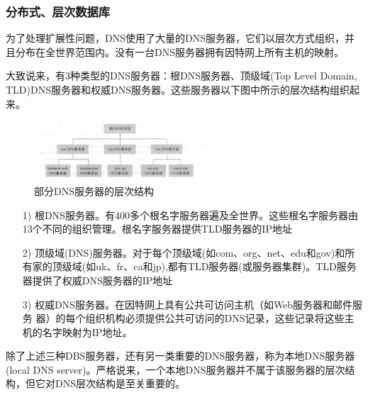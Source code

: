 \subsubsection{分布式、层次数据库}

    为了处理扩展性问题，DNS使用了大量的DNS服务器，它们以层次方式组织，并且分布在全世界范围内。没有一台DNS服务器拥有因特网上所有主机的映射。

    大致说来，有3种类型的DNS服务器：根DNS服务器、顶级域(Top Level Domain, TLD)DNS服务器和权威DNS服务器。这些服务器以下图中所示的层次结构组织起来。

\begin{figure}[!htbp]
    \centering
    \includegraphics[width=0.6\textwidth]{image/chapter02/DNS层级结构.png}
    \caption{部分DNS服务器的层次结构}
\end{figure}

\begin{itemize}
    \item [1)] 根DNS服务器。有400多个根名字服务器遍及全世界。这些根名字服务器由13个不同的组织管理。根名字服务器提供TLD服务器的IP地址
    \item [2)] 顶级域(DNS)服务器。对于每个顶级域(如com、org、net、edu和gov)和所有家的顶级域(如uk、fr、ca和jp),都有TLD服务器(或服务器集群)。TLD服务器提供了权威DNS服务器的IP地址
    \item [3)] 权威DNS服务器。在因特网上具有公共可访问主机（如Web服务器和邮件服务 器）的每个组织机构必须提供公共可访问的DNS记录，这些记录将这些主机的名字映射为IP地址。
\end{itemize}

    除了上述三种DBS服务器，还有另一类重要的DNS服务器，称为本地DNS服务器(local DNS server)。严格说来，一个本地DNS服务器并不属于该服务器的层次结构，但它对DNS层次结构是至关重要的。

